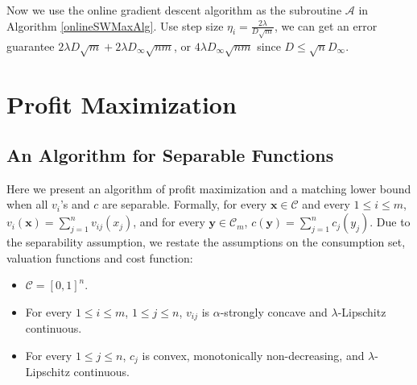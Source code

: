 \documentclass{article}
\begin{document}
Now we use the online gradient descent algorithm as the subroutine $\mathcal{A}$ in Algorithm \ref{onlineSWMaxAlg}. Use step size $\eta_i=\frac{2\lambda}{D\sqrt{m}}$, we can get an error guarantee $2\lambda D\sqrt{m}+2\lambda D_{\infty}\sqrt{nm}$, or $4\lambda D_{\infty}\sqrt{nm}$ since $D\le\sqrt{n}D_{\infty}$.


\section{Profit Maximization}
\subsection{An Algorithm for Separable Functions}
Here we present an algorithm of profit maximization and a matching lower bound when all $v_i$'s and $c$ are separable. Formally, for every $\mathbf{x}\in \mathcal{C}$ and every $1\le i\le m$, $v_i(\mathbf{x})=\sum_{j=1}^{n}v_{ij}(x_j)$, and for every $\mathbf{y}\in \mathcal{C}_m$, $c(\mathbf{y})=\sum_{j=1}^{n}c_j(y_j)$. Due to the separability assumption, we restate the assumptions on the consumption set, valuation functions and cost function:
\begin{itemize}
    \item $\mathcal{C}=[0,1]^n$.
    \item For every $1\le i\le m$, $1\le j\le n$, $v_{ij}$ is $\alpha$-strongly concave and $\lambda$-Lipschitz continuous.
    \item For every $1\le j\le n$, $c_j$ is convex, monotonically non-decreasing, and $\lambda$-Lipschitz continuous.
\end{itemize}
\end{document}
